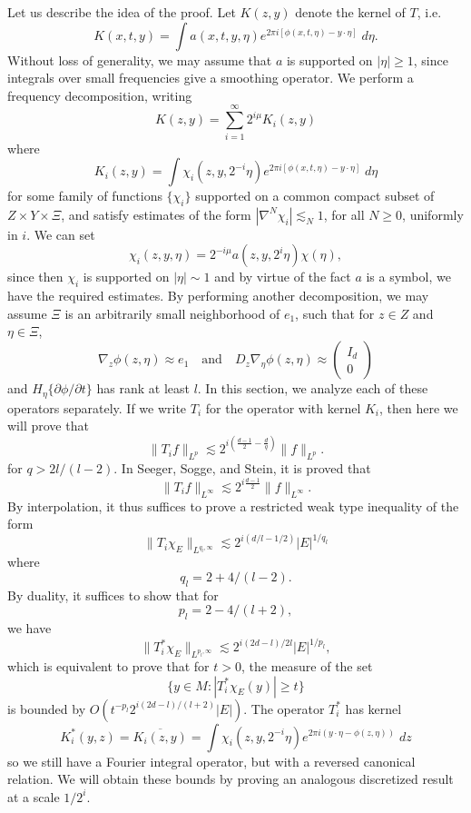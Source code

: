 Let us describe the idea of the proof. Let $K(z,y)$ denote the kernel of $T$, i.e.
%
\[ K(x,t,y) = \int a(x,t,y,\eta) e^{2 \pi i [\phi(x,t,\eta) - y \cdot \eta]}\; d\eta. \]
%
Without loss of generality, we may assume that $a$ is supported on $|\eta| \geq 1$, since integrals over small frequencies give a smoothing operator. We perform a frequency decomposition, writing
%
\[ K(z,y) = \sum_{i = 1}^\infty 2^{i \mu} K_i(z,y) \]
%
where
%
\[ K_i(z,y) = \int \chi_i(z,y,2^{-i} \eta) e^{2 \pi i [\phi(x,t,\eta) - y \cdot \eta]}\; d\eta \]
%
for some family of functions $\{ \chi_i \}$ supported on a common compact subset of $Z \times Y \times \Xi$, and satisfy estimates of the form $|\nabla^N \chi_i| \lesssim_N 1$, for all $N \geq 0$, uniformly in $i$. We can set
%
\[ \chi_i(z,y,\eta) = 2^{-i \mu} a(z,y, 2^i \eta) \chi(\eta), \]
%
since then $\chi_i$ is supported on $|\eta| \sim 1$ and by virtue of the fact $a$ is a symbol, we have the required estimates. By performing another decomposition, we may assume $\Xi$ is an arbitrarily small neighborhood of $e_1$, such that for $z \in Z$ and $\eta \in \Xi$,
%
\[ \nabla_z \phi(z,\eta) \approx e_1 \quad\text{and}\quad D_z \nabla_\eta \phi(z,\eta) \approx \begin{pmatrix} I_d \\ 0 \end{pmatrix} \]
%
and $H_\eta \{ \partial \phi / \partial t \}$ has rank at least $l$. In this section, we analyze each of these operators separately. If we write $T_i$ for the operator with kernel $K_i$, then here we will prove that
%
\[ \| T_i f \|_{L^p} \lesssim 2^{i \left( \frac{d-1}{2} - \frac{d}{q} \right)} \| f \|_{L^p}. \]
%
for $q > 2l/(l-2)$. In Seeger, Sogge, and Stein, it is proved that
%
\[ \| T_i f \|_{L^\infty} \lesssim 2^{i \frac{d-1}{2}} \| f \|_{L^\infty}. \]
%
By interpolation, it thus suffices to prove a restricted weak type inequality of the form
%
\[ \| T_i \chi_E \|_{L^{q_l,\infty}} \lesssim 2^{i(d/l - 1/2)} |E|^{1/q_l} \]
%
where
%
\[ q_l = 2 + 4/(l-2). \]
%
By duality, it suffices to show that for
%
\[ p_l = 2 - 4/(l+2), \]
%
we have
%
\[ \| T_i^* \chi_E \|_{L^{p_l,\infty}} \lesssim 2^{i(2d-l)/2l} |E|^{1/p_l}, \]
%
which is equivalent to prove that for $t > 0$, the measure of the set
%
\[ \{ y \in M : |T_i^* \chi_E(y)| \geq t \} \]
%
is bounded by $O(t^{-p_l} 2^{i(2d-l)/(l+2)} |E| )$. The operator $T_i^*$ has kernel
%
\[ K_i^*(y,z) = \overline{K_i(z,y)} = \int \chi_i(z,y, 2^{-i} \eta) e^{2 \pi i (y \cdot \eta - \phi(z,\eta))}\; dz \]
%
so we still have a Fourier integral operator, but with a reversed canonical relation. We will obtain these bounds by proving an analogous discretized result at a scale $1/2^i$.

